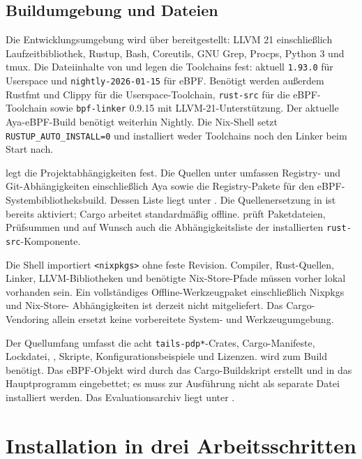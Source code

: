 \documentclass[12pt,a4paper]{article}
\begin{document}
\subsection{Buildumgebung und Dateien}
Die Entwicklungsumgebung wird über  bereitgestellt:
LLVM 21 einschließlich Laufzeitbibliothek, Rustup, Bash, Coreutils, GNU Grep,
Procps, Python 3 und tmux. Die Dateiinhalte von 
und  legen die Toolchains fest: aktuell
\texttt{1.93.0} für Userspace und \texttt{nightly-2026-01-15} für eBPF.
Benötigt werden außerdem Rustfmt und Clippy für die Userspace-Toolchain,
\texttt{rust-src} für die eBPF-Toolchain sowie \texttt{bpf-linker} 0.9.15
mit LLVM-21-Unterstützung. Der aktuelle Aya-eBPF-Build benötigt weiterhin Nightly.
Die Nix-Shell setzt \texttt{RUSTUP\_AUTO\_INSTALL=0} und installiert weder Toolchains
noch den Linker beim Start nach.

 legt die Projektabhängigkeiten fest. Die Quellen unter
 umfassen Registry- und Git-Abhängigkeiten einschließlich Aya
sowie die Registry-Pakete für den eBPF-Systembibliotheksbuild. Dessen Liste liegt
unter . Die Quellenersetzung in
 ist bereits aktiviert; Cargo arbeitet standardmäßig offline.
 prüft Paketdateien, Prüfsummen und auf Wunsch
auch die Abhängigkeitsliste der installierten \texttt{rust-src}-Komponente.

Die Shell importiert \texttt{<nixpkgs>} ohne feste Revision. Compiler, Rust-Quellen,
Linker, LLVM-Bibliotheken und benötigte Nix-Store-Pfade müssen vorher lokal vorhanden
sein. Ein vollständiges Offline-Werkzeugpaket einschließlich Nixpkgs und Nix-Store-
Abhängigkeiten ist derzeit nicht mitgeliefert. Das Cargo-Vendoring allein ersetzt
keine vorbereitete System- und Werkzeugumgebung.

Der Quellumfang umfasst die acht \texttt{tails-pdp*}-Crates, Cargo-Manifeste,
Lockdatei, , Skripte, Konfigurationsbeispiele und Lizenzen.
 wird zum Build benötigt.
Das eBPF-Objekt wird durch das Cargo-Buildskript erstellt und in das Hauptprogramm
eingebettet; es muss zur Ausführung nicht als separate Datei installiert werden.
Das Evaluationsarchiv liegt unter .

\section{Installation in drei Arbeitsschritten}
\end{document}
